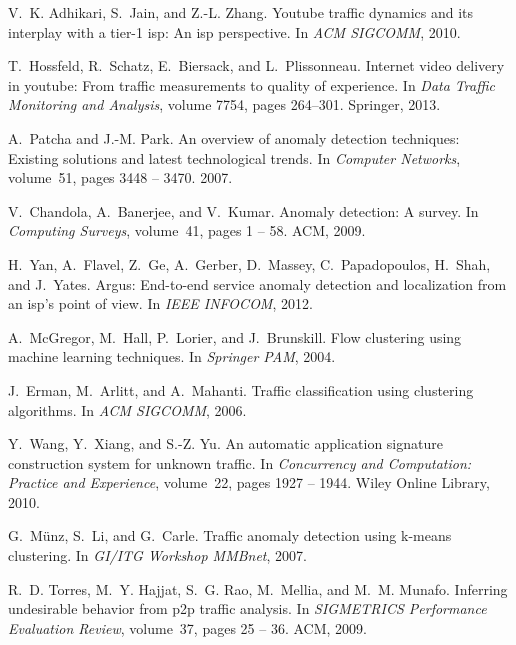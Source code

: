 \documentclass{acm_proc_article-sp}
\begin{document}
\begin{thebibliography}{10}
V.~K. Adhikari, S.~Jain, and Z.-L. Zhang.
\newblock Youtube traffic dynamics and its interplay with a tier-1 isp: An isp
  perspective.
\newblock In {\em ACM SIGCOMM}, 2010.

T.~Hossfeld, R.~Schatz, E.~Biersack, and L.~Plissonneau.
\newblock Internet video delivery in youtube: From traffic measurements to
  quality of experience.
\newblock In {\em Data Traffic Monitoring and Analysis}, volume 7754, pages
  264--301. Springer, 2013.

A.~Patcha and J.-M. Park.
\newblock An overview of anomaly detection techniques: Existing solutions and
  latest technological trends.
\newblock In {\em Computer Networks}, volume~51, pages 3448 -- 3470. 2007.

V.~Chandola, A.~Banerjee, and V.~Kumar.
\newblock Anomaly detection: A survey.
\newblock In {\em Computing Surveys}, volume~41, pages 1 -- 58. ACM, 2009.

H.~Yan, A.~Flavel, Z.~Ge, A.~Gerber, D.~Massey, C.~Papadopoulos, H.~Shah, and
  J.~Yates.
\newblock Argus: End-to-end service anomaly detection and localization from an
  isp's point of view.
\newblock In {\em IEEE INFOCOM}, 2012.

A.~McGregor, M.~Hall, P.~Lorier, and J.~Brunskill.
\newblock Flow clustering using machine learning techniques.
\newblock In {\em Springer PAM}, 2004.

J.~Erman, M.~Arlitt, and A.~Mahanti.
\newblock Traffic classification using clustering algorithms.
\newblock In {\em ACM SIGCOMM}, 2006.

Y.~Wang, Y.~Xiang, and S.-Z. Yu.
\newblock An automatic application signature construction system for unknown
  traffic.
\newblock In {\em Concurrency and Computation: Practice and Experience},
  volume~22, pages 1927 -- 1944. Wiley Online Library, 2010.

G.~M{\"u}nz, S.~Li, and G.~Carle.
\newblock Traffic anomaly detection using k-means clustering.
\newblock In {\em GI/ITG Workshop MMBnet}, 2007.

R.~D. Torres, M.~Y. Hajjat, S.~G. Rao, M.~Mellia, and M.~M. Munafo.
\newblock Inferring undesirable behavior from p2p traffic analysis.
\newblock In {\em SIGMETRICS Performance Evaluation Review}, volume~37, pages
  25 -- 36. ACM, 2009.


\end{thebibliography}
\end{document}
